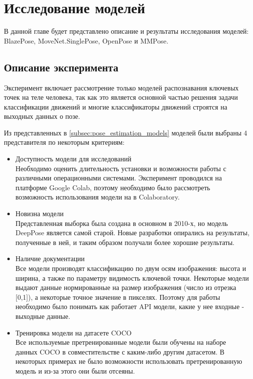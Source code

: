 \section{Исследование моделей}
\label{sec:Chapter4} 

В данной главе будет представлено описание и результаты исследования моделей: BlazePose, MoveNet.SinglePose, OpenPose и MMPose.


\subsection{Описание эксперимента}

Эксперимент включает рассмотрение только моделей распознавания ключевых точек на теле человека, так как это является основной частью решения задачи классификации движений и многие классификаторы движений строятся на выходных данных о позе.

Из представленных в \autoref{subsec:pose_estimation_models} моделей были выбраны 4 представителя по некоторым критериям:

\begin{itemize}
	\item Доступность модели для исследований\\
	Необходимо оценить длительность установки и возможности работы с различными операционными системами. Эксперимент проводился на платформе Google Colab, поэтому необходимо было рассмотреть возможность использования модели на в Colaboratory.
	\item Новизна модели\\
	Представленная выборка была создана в основном в 2010-х, но модель DeepPose является самой старой. Новые разработки опирались на результаты, полученные в ней, и таким образом получали более хорошие результаты.
	\item Наличие документации\\
	Все модели производят классификацию по двум осям изображения: высота и ширина, а также по параметру видимость ключевой точки. Некоторые модели выдают данные нормированные на размер изображения (число из отрезка [0,1]), а некоторые точное значение в пикселях. Поэтому для работы необходимо было понимать как работает API модели, какие у нее входные - выходные данные.
	\item Тренировка модели на датасете COCO\\
	Все используемые претренированные модели были обучены на наборе данных COCO \cite{COCO_topology} в совместительстве с каким-либо другим датасетом. В некоторых  примерах не было возможности использовать претренированную модель и из-за этого они были отсеяны.
\end{itemize}

